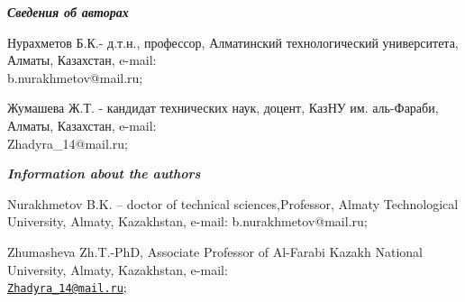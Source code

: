 \begin{authorinfo}
\emph{{\bfseries Сведения об авторах}}

Нурахметов Б.К.- д.т.н., профессор, Алматинский технологический
университета, Алматы, Казахстан, e-mail: \\b.nurakhmetov@mail.ru;

Жумашева Ж.Т. - кандидат технических наук, доцент, КазНУ им. аль-Фараби,
Алматы, Казахстан, e-mail: \\Zhadyra\_14@mail.ru;

\emph{{\bfseries Information about the authors}}

Nurakhmetov B.K. -- doctor of technical sciences,Professor, Almaty
Technological University, Almaty, Kazakhstan, e-mail: b.nurakhmetov@mail.ru;

Zhumasheva Zh.T.-PhD, Associate Professor of Al-Farabi Kazakh National
University, Almaty, Kazakhstan, e-mail:\\
\href{mailto:Zhadyra_14@mail.ru}{\nolinkurl{Zhadyra\_14@mail.ru}};
\end{authorinfo}

